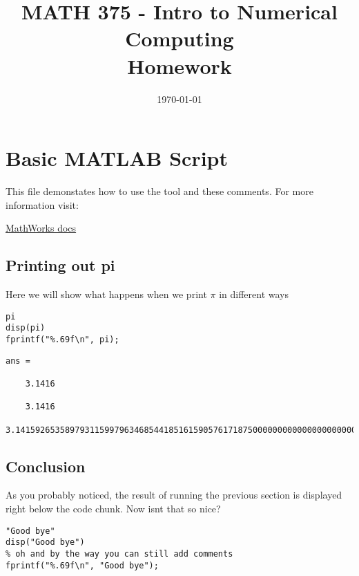 \documentclass{article}
\title{MATH 375 - Intro to Numerical Computing \\Homework \HWVersion}
\date{\today}
\begin{document}
\maketitle
\pagebreak[4]
\tableofcontents
\pagebreak[4]
\section*{Basic MATLAB Script}

\begin{par}
This file demonstates how to use the tool and these comments. For more information visit:
\end{par} \vspace{1em}
\begin{par}

\href{https://www.mathworks.com/help/matlab/matlab_prog/marking-up-matlab-comments-for-publishing.html}{MathWorks
docs}

\end{par} \vspace{1em}




\subsection*{Printing out pi}

\begin{par}
Here we will show what happens when we print $\pi$ in different ways
\end{par} \vspace{1em}
\begin{verbatim}
pi
disp(pi)
fprintf("%.69f\n", pi);
\end{verbatim}

        \color{lightgray} \begin{verbatim}
ans =

    3.1416

    3.1416

3.141592653589793115997963468544185161590576171875000000000000000000000
\end{verbatim} \color{black}
    

\subsection*{Conclusion}

\begin{par}
As you probably noticed, the result of running the previous section is displayed right below the code chunk. Now isnt that so nice?
\end{par} \vspace{1em}
\begin{verbatim}
"Good bye"
disp("Good bye")
% oh and by the way you can still add comments
fprintf("%.69f\n", "Good bye");
\end{verbatim}
\end{document}
